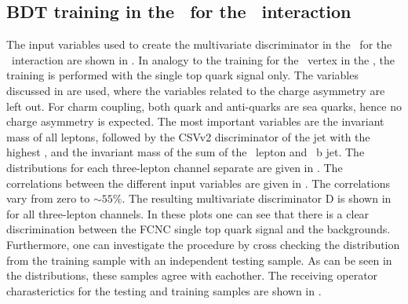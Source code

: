 \clearpage	
\subsection{BDT training in the \STSR\ for the \Zct\ interaction}
\label{sec:BDTSTSRZCT}
The input variables used to create the multivariate discriminator in the \STSR\ for the \Zct\ interaction are shown in . In analogy to the training for the \Zut\ vertex in the \STSR, the training is performed with the single top quark signal only. The variables discussed in  are used, where the variables related to the charge asymmetry are left out. For charm coupling, both quark and anti-quarks are sea quarks, hence no charge asymmetry is expected. The most important variables are the invariant mass of all leptons,  followed by the CSVv2 discriminator of the jet with the highest \pt, and the invariant mass of the sum of the \PW\ lepton and \SM\ b jet. The distributions for each three-lepton channel separate are given in .
The correlations between the different input variables are given in . The correlations vary from zero to $\sim 55\%$.
The resulting multivariate discriminator D is shown in  for all three-lepton channels. In these plots one can see that there is a clear discrimination between the FCNC single top quark signal and the backgrounds. Furthermore, one can investigate the procedure by cross checking the distribution from the training sample with an independent testing sample. As can be seen in the distributions, these samples agree with eachother. The receiving operator charasterictics for the testing and training samples are shown in . 

